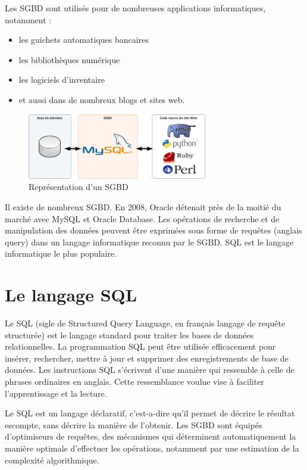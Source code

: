 \documentclass[oneside,13pt,a4paper]{report}
\begin{document}
Les SGBD sont utilisés pour de nombreuses applications informatiques, notamment :
\begin{itemize}
	\item les guichets automatiques bancaires
	\item les bibliothèques numérique
	\item les logiciels d'inventaire
	\item et aussi dans de nombreux blogs et sites web.
\end{itemize}


\begin{figure}[h]
	\centering
	\includegraphics[width=0.7\textwidth]{img/sgbd.png}
	\caption{Représentation d'un SGBD}
\end{figure}

Il existe de nombreux SGBD. En 2008, Oracle détenait près de la moitié du marché avec MySQL et Oracle Database.
Les opérations de recherche et de manipulation des données peuvent être exprimées sous forme de requêtes (anglais query)
dans un langage informatique reconnu par le SGBD. SQL est le langage informatique le plus populaire.

\section{Le langage SQL}
\label{sql}

Le SQL (sigle de Structured Query Language, en français langage de requête structurée) est le langage standard pour traiter les bases de données relationnelles. La programmation SQL peut être utilisée efficacement pour insérer, rechercher, mettre à jour et supprimer des enregistrements de base de données. Les instructions SQL s'écrivent d'une manière qui ressemble à celle de phrases ordinaires en anglais. Cette ressemblance voulue vise à faciliter l'apprentissage et la lecture.

Le SQL est un langage déclaratif, c'est-a-dire qu'il permet de décrire le résultat escompte, sans décrire la manière de l'obtenir. Les SGBD sont équipés d'optimiseurs de requêtes, des mécanismes qui déterminent automatiquement la manière optimale d'effectuer les opérations, notamment par une estimation de la complexité algorithmique.
\end{document}
